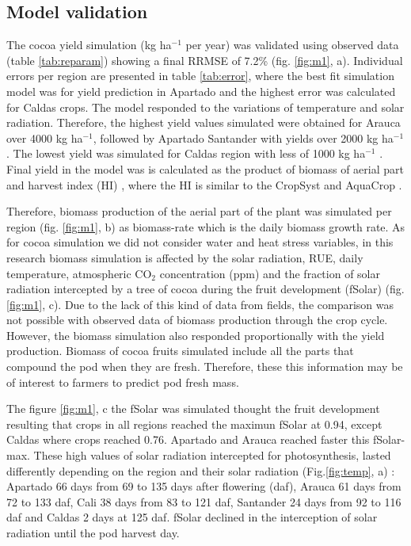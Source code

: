 \documentclass[gene,journal,article,submit,moreauthors,pdftex]{Definitions/mdpi}
\begin{document}
\subsection{Model validation}
The cocoa yield simulation (kg ha$^{-1}$ per year) was validated using observed data (table \ref{tab:reparam}) showing a final RRMSE of 7.2\% (fig. \ref{fig:m1}, a). Individual errors per region are presented in table \ref{tab:error}, where the best fit simulation model was for yield prediction in Apartado and the highest error was calculated for Caldas crops.  The model responded to the variations of temperature and solar radiation. Therefore, the highest  yield values simulated were obtained for Arauca over 4000 kg ha$^{-1}$, followed by Apartado Santander with yields over 2000 kg ha$^{-1}$.  The lowest yield was simulated for Caldas region with less of 1000 kg ha$^{-1}$ . Final yield in the model was is calculated as the product of biomass of aerial part and harvest index (HI) \citep{Zao2019simple, Amir1991}, where the HI is similar to the CropSyst \citep{STOCKLE2003} and AquaCrop \cite{Steduto2009}. 

Therefore, biomass production of the aerial part of the plant was simulated per region (fig. \ref{fig:m1}, b) as biomass-rate which is the daily biomass growth rate.  As for cocoa simulation we did not consider water and heat stress variables, in this research biomass simulation is affected by the solar radiation, RUE, daily temperature, atmospheric CO$_{2}$ concentration (ppm) and the fraction of solar radiation intercepted by a tree of cocoa during the fruit development (fSolar) (fig. \ref{fig:m1}, c). Due to the lack of this kind of data from fields, the comparison was not possible with observed data of biomass production through the crop cycle. However, the biomass simulation also responded proportionally with the yield production. Biomass of cocoa fruits simulated include all the parts that compound  the pod when they are fresh. Therefore, these this information may be of interest to farmers to predict pod fresh mass. 

The figure \ref{fig:m1}, c the fSolar was simulated thought the fruit development resulting that crops in  all regions reached the maximun fSolar at 0.94, except Caldas where crops reached 0.76.  Apartado and Arauca reached faster this fSolar-max. These high values of solar radiation intercepted for photosynthesis, lasted differently depending on the region and their solar radiation (Fig.\ref{fig:temp}, a) : Apartado 66 days  from  69 to 135 days after flowering (daf),  Arauca 61 days from 72 to 133 daf, Cali 38 days from 83 to 121 daf,  Santander 24 days from 92 to 116 daf and Caldas 2 days at 125 daf. fSolar declined in the interception of solar radiation until the pod harvest day. 
\end{document}
